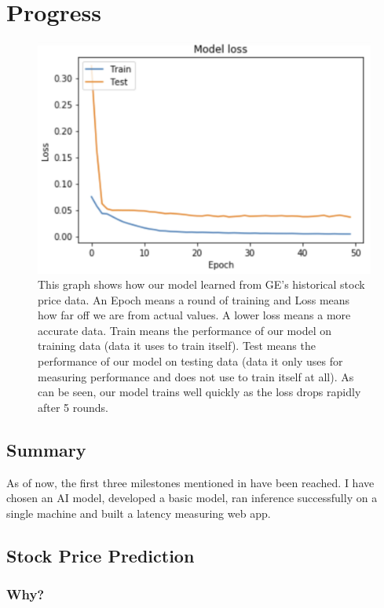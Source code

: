 \documentclass{report}
\begin{document}
\chapter{Progress}\label{chap:progress}

\begin{figure}
  \includegraphics[width=\textwidth]{EpochVModelLoss.png}
  \caption{This graph shows how our model learned from GE's historical stock price data. An Epoch means a round of training and Loss means how far off we are from actual values. A lower loss means a more accurate data. Train means the performance of our model on training data (data it uses to train itself). Test means the performance of our model on testing data (data it only uses for measuring performance and does not use to train itself at all). As can be seen, our model trains well quickly as the loss drops rapidly after 5 rounds.}
  \label{fig:EpochVModelLoss}
\end{figure}

\section{Summary}
As of now, the first three milestones mentioned in  have been reached.
I have chosen an AI model, developed a basic model, ran inference successfully on a single machine and built a latency measuring web app.

\section{Stock Price Prediction}
\subsection{Why?}
\end{document}
